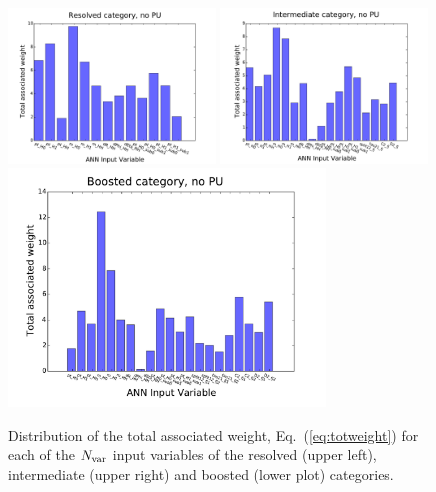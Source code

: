 \begin{figure}[t]
  \begin{center}
    \includegraphics[width=0.49\textwidth]{plots/res_wgthist_noPU.pdf}
\includegraphics[width=0.49\textwidth]{plots/int_wgthist_noPU.pdf}
\includegraphics[width=0.75\textwidth]{plots/bst_wgthist_noPU.pdf}
\vspace{-0.5cm}
\caption{\small
Distribution of the total associated weight,
Eq.~(\ref{eq:totweight}) for each of the $N_{\rm var}$ input
variables of the resolved (upper left),  intermediate (upper right)
and boosted (lower plot)
categories.
}
\label{fig:nnweights}
\end{center}
\end{figure}

